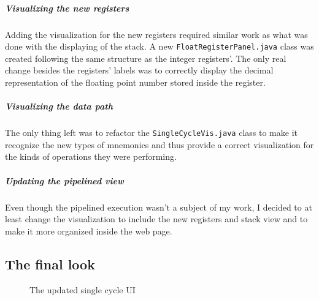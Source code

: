 \subparagraph*{Visualizing the new registers}

Adding the visualization for the new registers required similar work as what was done with the displaying of the stack. A new \verb|FloatRegisterPanel.java| class was created following the same structure as the integer registers'. The only real change besides the registers' labels was to correctly display the decimal representation of the floating point number stored inside the register.

\subparagraph*{Visualizing the data path}

The only thing left was to refactor the \verb|SingleCycleVis.java| class to make it recognize the new types of mnemonics and thus provide a correct visualization for the kinds of operations they were performing.

\subparagraph*{Updating the pipelined view}

Even though the pipelined execution wasn't a subject of my work, I decided to at least change the visualization to include the new registers and stack view and to make it more organized inside the web page.

\subsection*{The final look}

\begin{figure}[H]
	\centering	
	\caption{The updated single cycle UI}
\end{figure}

